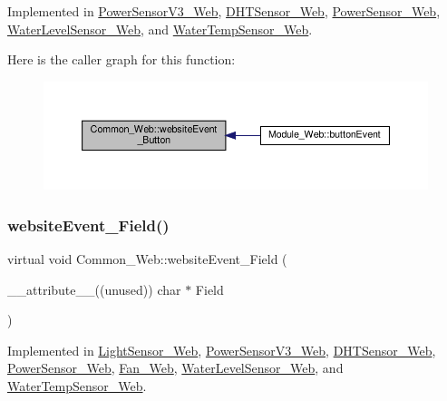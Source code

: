 Implemented in \hyperlink{class_power_sensor_v3___web_a6032d4ab98373d58ac532c4aa03c8f26}{Power\+Sensor\+V3\+\_\+\+Web}, \hyperlink{class_d_h_t_sensor___web_aad3323a4869c3cf99d7c5e257b487867}{D\+H\+T\+Sensor\+\_\+\+Web}, \hyperlink{class_power_sensor___web_a30ec071067c612277dd426f96cc2f1a3}{Power\+Sensor\+\_\+\+Web}, \hyperlink{class_water_level_sensor___web_af70800c309eaf938c8974f71a9c2d0e2}{Water\+Level\+Sensor\+\_\+\+Web}, and \hyperlink{class_water_temp_sensor___web_a74a2ece81622e14523727c69a093477b}{Water\+Temp\+Sensor\+\_\+\+Web}.

Here is the caller graph for this function\+:
\nopagebreak
\begin{figure}[H]
\begin{center}
\leavevmode
\includegraphics[width=350pt]{class_common___web_acd10f27b30f3111277b4730ee5495090_icgraph}
\end{center}
\end{figure}
\mbox{\label{class_common___web_a898e3fd8cc6384ecbbbd79c8a3a13b62}} 
\subsubsection{\texorpdfstring{website\+Event\+\_\+\+Field()}{websiteEvent\_Field()}}
{\footnotesize\ttfamily virtual void Common\+\_\+\+Web\+::website\+Event\+\_\+\+Field (\begin{DoxyParamCaption}\item[{\+\_\+\+\_\+attribute\+\_\+\+\_\+((unused)) char $\ast$}]{Field }\end{DoxyParamCaption})\hspace{0.3cm}{\ttfamily [pure virtual]}}



Implemented in \hyperlink{class_light_sensor___web_af16ca5f334562e0b66ffe14ec0274c52}{Light\+Sensor\+\_\+\+Web}, \hyperlink{class_power_sensor_v3___web_a80d9707667d1ac9f6dc1ccf1b6a07287}{Power\+Sensor\+V3\+\_\+\+Web}, \hyperlink{class_d_h_t_sensor___web_a1bd32356da7d365f165a05475fcc1877}{D\+H\+T\+Sensor\+\_\+\+Web}, \hyperlink{class_power_sensor___web_ab36fd816b46c6b030a0f4f2f48316c1e}{Power\+Sensor\+\_\+\+Web}, \hyperlink{class_fan___web_a0546808ac50ae701ca6b1776a1ce50f8}{Fan\+\_\+\+Web}, \hyperlink{class_water_level_sensor___web_a4cce09a705011d6bdf685b5f2d3d771c}{Water\+Level\+Sensor\+\_\+\+Web}, and \hyperlink{class_water_temp_sensor___web_a893dd03626c604d634816d0feca46706}{Water\+Temp\+Sensor\+\_\+\+Web}.

